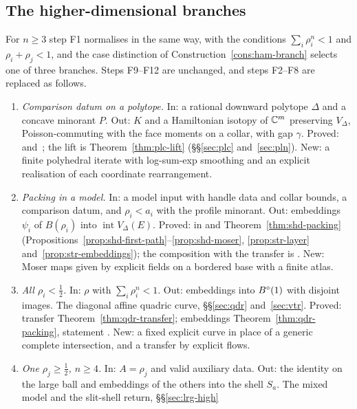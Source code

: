 \subsection{The higher-dimensional branches}\label{sec:guide-high}

For $n\ge3$ step F1 normalises in the same way, with the conditions $\sum_i\rho_i^n<1$ and $\rho_i+\rho_j<1$, and the
case distinction of Construction~\ref{cons:ham-branch} selects one of three branches. Steps F9--F12 are unchanged, and
steps F2--F8 are replaced as follows.

\begin{enumerate}[label=\textbf{H\arabic*},leftmargin=*,itemsep=3pt]
\item \emph{Comparison datum on a polytope.} In: a rational downward polytope $\Delta$ and a concave minorant $P$.
 Out: $K$ and a Hamiltonian isotopy of $\mathbb{C}^m$ preserving $V_\Delta$, Poisson-commuting with the face moments on a
 collar, with gap $\gamma$. Proved:  and~; the lift is
 Theorem~\ref{thm:plc-lift} (\S\S\ref{sec:plc} and~\ref{sec:pln}). New: a finite polyhedral iterate with log-sum-exp
 smoothing and an explicit realisation of each coordinate rearrangement.
\item \emph{Packing in a model.} In: a model input with handle data and collar bounds, a comparison datum, and
 $\rho_i<a_i$ with the profile minorant. Out: embeddings $\psi_i$ of $B(\rho_i)$ into $\operatorname{int}V_\Delta(E)$.
 Proved:  in  and Theorem~\ref{thm:shd-packing}
 (Propositions~\ref{prop:shd-first-path}--\ref{prop:shd-moser}, \ref{prop:str-layer} and~\ref{prop:str-embeddings}); the
 composition with the transfer is . New: Moser maps given by explicit fields on a
 bordered base with a finite atlas.
\item \emph{All $\rho_i<\frac12$.} In: $\rho$ with $\sum_i\rho_i^n<1$. Out: embeddings into $B^{\circ}(1)$ with disjoint images.
 The diagonal affine quadric curve, \S\S\ref{sec:qdr} and~\ref{sec:vtr}. Proved: transfer
 Theorem~\ref{thm:qdr-transfer}; embeddings Theorem~\ref{thm:qdr-packing}, statement . New: a
 fixed explicit curve in place of a generic complete intersection, and a transfer by explicit flows.
\item \emph{One $\rho_j\ge\frac12$, $n\ge4$.} In: $A=\rho_j$ and valid auxiliary data. Out: the identity on the large ball
 and embeddings of the others into the shell $S_a$. The mixed model and the slit-shell return, \S\S\ref{sec:lrg-high}

\end{enumerate}
